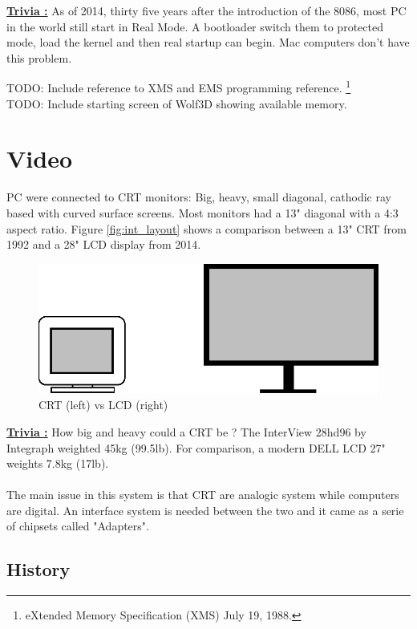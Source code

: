 \documentclass[book.tex]{subfiles}
\begin{document}
\textbf{\underline{Trivia :}}  As of 2014, thirty five years after the introduction of the 8086, most PC in the world still start in Real Mode. A bootloader switch them to protected mode, load the kernel and then real startup can begin. Mac computers don't have this problem.

\bigskip

TODO: Include reference to XMS and EMS programming reference. \footnote{eXtended Memory Specification (XMS) July 19, 1988.}\\

TODO: Include starting screen of Wolf3D showing available memory.\\

\section{Video}

PC were connected to CRT monitors: Big, heavy, small diagonal, cathodic ray based with curved surface screens. Most monitors had a 13" diagonal with a 4:3 aspect ratio. Figure \ref{fig:int_layout} shows a comparison between a 13" CRT from 1992 and a 28" LCD display from 2014.\\

\begin{figure}[H]
\centering
\includegraphics[scale=1.2]{imgs/crt_lcd.eps}
\caption{CRT (left) vs LCD (right)}
\label{fig:lcd_vs_crt}
\end{figure}

\textbf{\underline{Trivia :}} How big and heavy could a CRT be ? The InterView 28hd96 by Integraph weighted 45kg (99.5lb). For comparison, a modern DELL LCD 27" weights 7.8kg (17lb).\\
\\
The main issue in this system is that CRT are analogic system while computers are digital. An interface system is needed between the two and it came as a serie of chipsets called "Adapters".

  \subsection{History}
\end{document}
